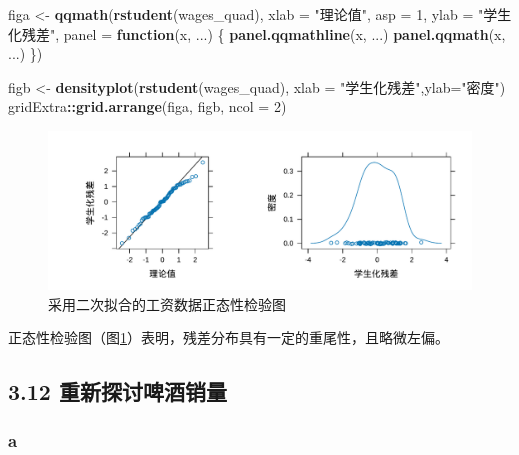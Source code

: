 \documentclass[
]{article}
\newenvironment{Shaded}{\begin{snugshade}}{\end{snugshade}}
\newcommand{\AttributeTok}[1]{\textcolor[rgb]{0.13,0.29,0.53}{#1}}
\newcommand{\ControlFlowTok}[1]{\textcolor[rgb]{0.13,0.29,0.53}{\textbf{#1}}}
\newcommand{\DecValTok}[1]{\textcolor[rgb]{0.00,0.00,0.81}{#1}}
\newcommand{\FunctionTok}[1]{\textcolor[rgb]{0.13,0.29,0.53}{\textbf{#1}}}
\newcommand{\NormalTok}[1]{#1}
\newcommand{\OtherTok}[1]{\textcolor[rgb]{0.56,0.35,0.01}{#1}}
\newcommand{\SpecialCharTok}[1]{\textcolor[rgb]{0.81,0.36,0.00}{\textbf{#1}}}
\newcommand{\StringTok}[1]{\textcolor[rgb]{0.31,0.60,0.02}{#1}}
\begin{document}
\begin{Shaded}
\begin{Highlighting}[]
\NormalTok{figa }\OtherTok{\textless{}{-}} 
  \FunctionTok{qqmath}\NormalTok{(}\FunctionTok{rstudent}\NormalTok{(wages\_quad), }\AttributeTok{xlab =} \StringTok{"理论值"}\NormalTok{,}
       \AttributeTok{asp =} \DecValTok{1}\NormalTok{,}
       \AttributeTok{ylab =} \StringTok{"学生化残差"}\NormalTok{,}
       \AttributeTok{panel =} \ControlFlowTok{function}\NormalTok{(x, ...) \{}
         \FunctionTok{panel.qqmathline}\NormalTok{(x, ...)}
         \FunctionTok{panel.qqmath}\NormalTok{(x, ...)}
\NormalTok{       \})}

\NormalTok{figb }\OtherTok{\textless{}{-}} \FunctionTok{densityplot}\NormalTok{(}\FunctionTok{rstudent}\NormalTok{(wages\_quad), }\AttributeTok{xlab =} \StringTok{"学生化残差"}\NormalTok{,}\AttributeTok{ylab=}\StringTok{"密度"}\NormalTok{)}
\NormalTok{gridExtra}\SpecialCharTok{::}\FunctionTok{grid.arrange}\NormalTok{(figa, figb, }\AttributeTok{ncol =} \DecValTok{2}\NormalTok{)}
\end{Highlighting}
\end{Shaded}

\begin{figure}
\centering
\includegraphics{chapter3_files/figure-latex/wages-norm-1.pdf}
\caption{\label{fig:wages-norm}采用二次拟合的工资数据正态性检验图}
\end{figure}

正态性检验图（图\ref{fig:wages-norm}）表明，残差分布具有一定的重尾性，且略微左偏。

\hypertarget{ux91cdux65b0ux63a2ux8ba8ux5564ux9152ux9500ux91cf}{%
\subsection{3.12 重新探讨啤酒销量}\label{ux91cdux65b0ux63a2ux8ba8ux5564ux9152ux9500ux91cf}}

\hypertarget{a-6}{%
\subsubsection*{a}\label{a-6}}
\end{document}
